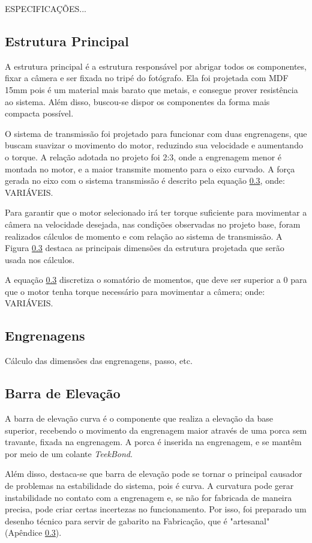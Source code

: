 ESPECIFICAÇÕES...

\subsection{Estrutura Principal}

A estrutura principal é a estrutura responsável por abrigar todos os componentes, fixar a câmera e ser fixada no tripé do fotógrafo. Ela foi projetada com MDF 15mm pois é um material mais barato que metais, e consegue prover resistência ao sistema. Além disso, buscou-se dispor os componentes da forma mais compacta possível. 

O sistema de transmissão foi projetado para funcionar com duas engrenagens, que buscam suavizar o movimento do motor, reduzindo sua velocidade e aumentando o torque. A relação adotada no projeto foi 2:3, onde a engrenagem menor é montada no motor, e a maior transmite momento para o eixo curvado. A força gerada no eixo com o sistema transmissão é descrito pela equação \ref{}, onde: VARIÁVEIS.

Para garantir que o motor selecionado irá ter torque suficiente para movimentar a câmera na velocidade desejada, nas condições observadas no projeto base, foram realizados cálculos de momento e com relação ao sistema de transmissão. A Figura \ref{} destaca as principais dimensões da estrutura projetada que serão usada nos cálculos. 


A equação \ref{} discretiza o somatório de momentos, que deve ser superior a 0 para que o motor tenha torque necessário para movimentar a câmera; onde: VARIÁVEIS. 



\subsection{Engrenagens}
Cálculo das dimensões das engrenagens, passo, etc.



\subsection{Barra de Elevação}

A barra de elevação curva é o componente que realiza a elevação da base superior, recebendo o movimento da engrenagem maior através de uma porca sem travante, fixada na engrenagem. A porca é inserida na engrenagem, e se mantêm por meio de um colante \textit{TeekBond}. 

Além disso, destaca-se que barra de elevação pode se tornar o principal causador de problemas na estabilidade do sistema, pois é curva. A curvatura pode gerar instabilidade no contato com a engrenagem e, se não for fabricada de maneira precisa, pode criar certas incertezas no funcionamento. Por isso, foi preparado um desenho técnico para servir de gabarito na Fabricação, que é "artesanal" (Apêndice \ref{}). 

